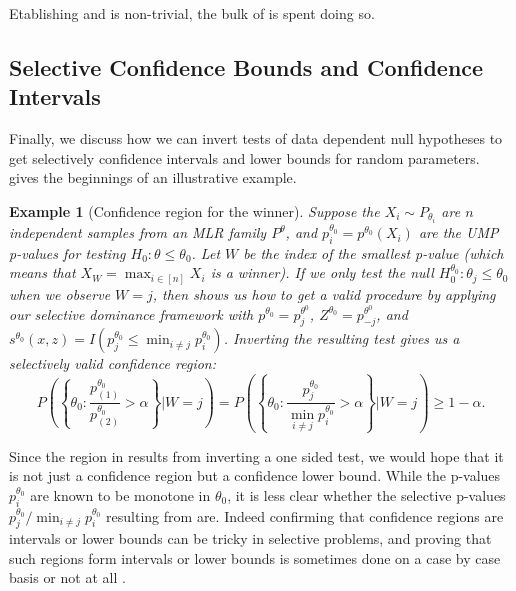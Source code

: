 \documentclass{article}
\newtheorem{example}{Example}
\begin{document}
Etablishing  and  is non-trivial, the bulk of  is spent doing so. 

\subsection{Selective Confidence Bounds and Confidence Intervals}

Finally, we discuss how we can invert tests of data dependent null hypotheses to get selectively confidence intervals and lower bounds for random parameters.  gives the beginnings of an illustrative example. 

\begin{example}[Confidence region for the winner] 
    \label{exm:confidence_region}
    Suppose the $X_i \sim P_{\theta_i}$ are $n$ independent samples from an MLR family $P^{\theta}$, and $p^{\theta_0}_i =  p^{\theta_0}(X_i)$ are the UMP p-values for testing $H_0 : \theta \leq \theta_0$. Let $W$ be the index of the smallest p-value (which means that $X_W = \max_{i \in [n]} X_i$ is a winner). If we only test the null $H_0^{\theta_0}: \theta_j \leq \theta_0$ when we observe $W=j$, then  shows us how to get a valid procedure by applying our selective dominance framework with $p^{\theta_0} = p^{\theta^0}_j$, $Z^{\theta_0} = p^{\theta^0}_{-j}$, and $s^{\theta_0}(x, z) = I(p^{\theta_0}_j \leq \min_{i \neq j} p^{\theta_0}_i)$. Inverting the resulting test gives us a selectively valid confidence region:
    \begin{equation}
        \label{eq:winner_lcb}
        P\left(\left\{ \theta_0 : \frac{p^{\theta_0}_{(1)}}{p^{\theta_0}_{(2)}} > \alpha \right\} | W=j \right) = P\left(\left\{ \theta_0 : \frac{p^{\theta_0}_{j}}{ \min_{i \neq j} p^{\theta_0}_i} > \alpha \right\} | W=j \right) \geq 1-\alpha.
    \end{equation} 
\end{example}

Since the region in  results from inverting a one sided test, we would hope that it is not just a confidence region but a confidence lower bound. While the p-values $p^{\theta_0}_i$ are known to be monotone in $\theta_0$, it is less clear whether the selective p-values $p^{\theta_0}_{j}/ \min_{i \neq j} p^{\theta_0}_i$ resulting from  are. Indeed confirming that confidence regions are intervals or lower bounds can be tricky in selective problems, and proving that such regions form intervals or lower bounds is sometimes done on a case by case basis  \citep{Benjamini, Lee} or not at all \citep{Sengupta}. 
\end{document}
